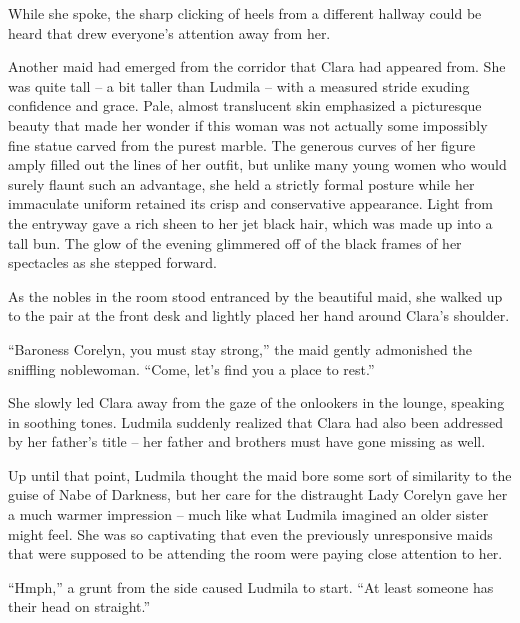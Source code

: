  

While she spoke, the sharp clicking of heels from a different hallway could be heard that drew everyone’s attention away from her.

 

Another maid had emerged from the corridor that Clara had appeared from. She was quite tall – a bit taller than Ludmila – with a measured stride exuding confidence and grace. Pale, almost translucent skin emphasized a picturesque beauty that made her wonder if this woman was not actually some impossibly fine statue carved from the purest marble. The generous curves of her figure amply filled out the lines of her outfit, but unlike many young women who would surely flaunt such an advantage, she held a strictly formal posture while her immaculate uniform retained its crisp and conservative appearance. Light from the entryway gave a rich sheen to her jet black hair, which was made up into a tall bun. The glow of the evening glimmered off of the black frames of her spectacles as she stepped forward.

 

As the nobles in the room stood entranced by the beautiful maid, she walked up to the pair at the front desk and lightly placed her hand around Clara’s shoulder.

 

“Baroness Corelyn, you must stay strong,” the maid gently admonished the sniffling noblewoman. “Come, let’s find you a place to rest.”

 

She slowly led Clara away from the gaze of the onlookers in the lounge, speaking in soothing tones. Ludmila suddenly realized that Clara had also been addressed by her father’s title – her father and brothers must have gone missing as well.

 

Up until that point, Ludmila thought the maid bore some sort of similarity to the guise of Nabe of Darkness, but her care for the distraught Lady Corelyn gave her a much warmer impression – much like what Ludmila imagined an older sister might feel. She was so captivating that even the previously unresponsive maids that were supposed to be attending the room were paying close attention to her.

 

“Hmph,” a grunt from the side caused Ludmila to start. “At least someone has their head on straight.”

 

